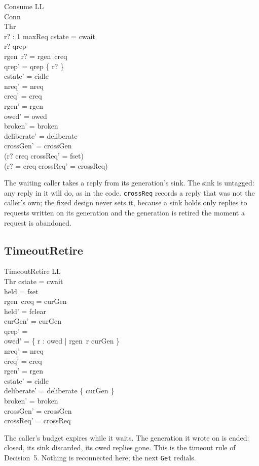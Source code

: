 \documentclass[a4paper,10pt,fleqn]{article}
\begin{document}
\begin{schema}{Consume}
  \Delta LL \\
  \Xi Conn \\
  \Xi Thr \\
  r? : 1 \upto maxReq
\where
  cstate = cwait \\
  r? \in qrep \\
  rgen~r? = rgen~creq \\
  qrep' = qrep \setminus \{ r? \} \\
  cstate' = cidle \\
  nreq' = nreq \\
  creq' = creq \\
  rgen' = rgen \\
  owed' = owed \\
  broken' = broken \\
  deliberate' = deliberate \\
  crossGen' = crossGen \\
  (r? \neq creq \implies crossReq' = fset) \\
  (r? = creq \implies crossReq' = crossReq)
\end{schema}
The waiting caller takes a reply from its generation's sink.  The sink is
untagged: any reply in it will do, as in the code.  \texttt{crossReq} records
a reply that was not the caller's own; the fixed design never sets it,
because a sink holds only replies to requests written on its generation and
the generation is retired the moment a request is abandoned.

\subsection{TimeoutRetire}

\begin{schema}{TimeoutRetire}
  \Delta LL \\
  \Xi Thr
\where
  cstate = cwait \\
  held = fset \\
  rgen~creq = curGen \\
  held' = fclear \\
  curGen' = curGen \\
  qrep' = \emptyset \\
  owed' = \{ r : owed | rgen~r \neq curGen \} \\
  nreq' = nreq \\
  creq' = creq \\
  rgen' = rgen \\
  cstate' = cidle \\
  deliberate' = deliberate \cup \{ curGen \} \\
  broken' = broken \\
  crossGen' = crossGen \\
  crossReq' = crossReq
\end{schema}
The caller's budget expires while it waits.  The generation it wrote on is
ended: closed, its sink discarded, its owed replies gone.  This is the
timeout rule of Decision~5.  Nothing is reconnected here; the next
\texttt{Get} redials.
\end{document}
